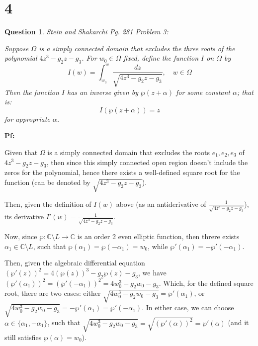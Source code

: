 \documentclass{article}
\newtheorem{question}{Question}
\begin{document}
\break

\section*{4}
\begin{myBox}[]{}
    \begin{question}
        Stein and Shakarchi Pg. 281 Problem 3:

        Suppose $\Omega$ is a simply connected domain that excludes the three roots of the polynomial $4z^3-g_2z-g_3$.
        For $w_0\in\Omega$ fixed, define the function $I$ on $\Omega$ by 
        $$I(w)=\int_{w_0}^{w}\frac{dz}{\sqrt{4z^3-g_2z-g_3}},\quad w\in\Omega$$
        Then the function $I$ has an inverse given by $\wp(z+\alpha)$ for some constant $\alpha$; that is:
        $$I(\wp(z+\alpha))=z$$
        for appropriate $\alpha$.
    \end{question}
\end{myBox}

\textbf{Pf:}

Given that $\Omega$ is a simply connected domain that excludes the roots $e_1,e_2,e_3$ of $4z^3-g_2z-g_3$,
then since this simply connected open region doesn't include the zeros for the polynomial, hence there exists a well-defined square root for the function
(can be denoted by $\sqrt{4z^3-g_2z-g_3}$).

Then, given the definition of $I(w)$ above (as an antiderivative of $\frac{1}{\sqrt{4z^3-g_2z-g_3}}$), its derivative $I'(w)=\frac{1}{\sqrt{4z^3-g_2z-g_3}}$.

\hfil

Now, since $\wp:\mathbb{C}\setminus L\rightarrow\mathbb{C}$ is an order 2 even elliptic function, then threre exists $\alpha_1\in \mathbb{C}\setminus L$, such that $\wp(\alpha_1)=\wp(-\alpha_1)=w_0$,
while $\wp'(\alpha_1) = -\wp'(-\alpha_1)$.

Then, given the algebraic differential equation $(\wp'(z))^2=4(\wp(z))^3-g_2\wp(z)-g_3$, we have $(\wp'(\alpha_1))^2=(\wp'(-\alpha_1))^2 = 4w_0^3-g_2w_0-g_3$. 
Which, for the defined square root, there are two cases: either $\sqrt{4w_0^3-g_2w_0-g_3} = \wp'(\alpha_1)$, or $\sqrt{4w_0^3-g_2w_0-g_3} = -\wp'(\alpha_1) = \wp'(-\alpha_1)$.
In either case, we can choose $\alpha\in \{\alpha_1,-\alpha_1\}$, such that $\sqrt{4w_0^3-g_2w_0-g_3} = \sqrt{(\wp'(\alpha))^2} = \wp'(\alpha)$ (and it still satisfies $\wp(\alpha)=w_0$).
\end{document}
